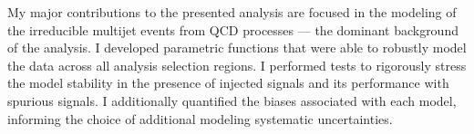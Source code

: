 My major contributions to the presented analysis are focused in the modeling of the irreducible multijet events from QCD processes --- the dominant background of the analysis.
I developed parametric functions that were able to robustly model the data across all analysis selection regions.
I performed tests to rigorously stress the model stability in the presence of injected signals and its performance with spurious signals.
I additionally quantified the biases associated with each model, informing the choice of additional modeling systematic uncertainties.
